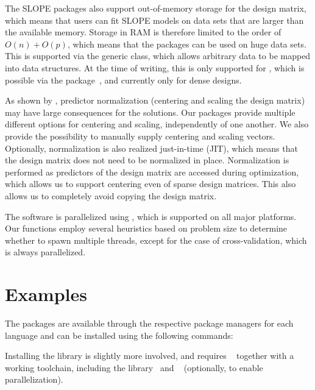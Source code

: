 \documentclass[article]{jss}
\begin{document}
The SLOPE packages also support out-of-memory storage for the design matrix, which
means that users can fit SLOPE models on data sets that are larger than the
available memory. Storage in RAM is therefore limited to the order of \(O(n) +
O(p)\), which means that the packages can be used on huge data sets.
This is supported via the generic  class, which allows
arbitrary data to be mapped into  data structures. At the
time of writing, this is only supported for ,
which is possible via the  package~\citep{kane2013},
and currently only for dense designs.

As shown by \citet{larsson2025}, predictor normalization (centering and scaling
the design matrix) may have large consequences for the solutions. Our packages
provide multiple different options for centering and scaling, independently of
one another. We also provide the possibility to manually supply centering and
scaling vectors. Optionally, normalization is also realized just-in-time (JIT),
which means that the design matrix does not need to be normalized in place.
Normalization is performed as predictors of the design matrix are accessed
during optimization, which allows us to support centering even of sparse design
matrices. This also allows us to completely avoid copying the design matrix.

The software is parallelized using , which is supported on all
major platforms. Our functions employ several heuristics based on problem size to
determine whether to spawn multiple threads, except
for the case of cross-validation, which is always parallelized.

\section{Examples}\label{sec:examples}

The packages are available through the respective package managers for each
language and can be installed using the following commands:
%
\begin{description}[labelwidth=8ex]
  \item[\proglang{R}] 
  \item[\proglang{Python}] 
  \item[\proglang{Julia}] 
\end{description}

Installing the  library is slightly more involved, and requires
~\citep{kitware2025} together with a working  toolchain, including
the  library~\citep{guennebaud2010a} and ~\citep{dagum1998} (optionally,
to enable parallelization).
\end{document}
